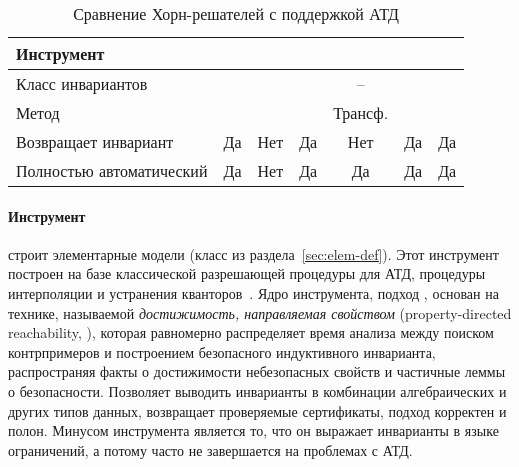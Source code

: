 \begin{table} [htbp]
    \centering
    \begin{threeparttable}%
        \caption{Сравнение Хорн-решателей с поддержкой АТД}\label{tab:hornSolvers}%
        \begin{tabular}{| m{30mm} || c | c | c | c | c | c |}
            \hline
            \hline
            Инструмент & \spacer{} & \racer{} & \eldarica{} & \vericat{} & \hoice{} & \rchc{} \\\hline
            Класс инвариантов & \elemclass{} & \catelemclass{} & \sizeelemclass{} & -- & \elemclass{} & \syncRegFlatClass{}\\\hline
            Метод & \pdr{} & \pdr{} & \cegar{} & Трансф. & \ice{} & \ice{}\\\hline
            Возвращает инвариант & Да & Нет & Да & Нет & Да & Да\\\hline
            Полностью автоматический & Да & Нет & Да & Да & Да & Да\\
            \hline
            \hline
        \end{tabular}
    \end{threeparttable}
\end{table}

\paragraph{Инструмент \spacer{}~\cite{komuravelli2016smt}} строит элементарные модели (класс \elemclass{} из раздела~\cref{sec:elem-def}).
Этот инструмент построен на базе классической разрешающей процедуры для АТД, процедуры интерполяции и устранения кванторов~\cite{bjorner2015playing}.
Ядро инструмента, подход \spacer{}, основан на технике, называемой \emph{достижимость, направляемая свойством} \foreignlanguage{english}{(property-directed reachability, \pdr{})}, которая равномерно распределяет время анализа между поиском контрпримеров и построением безопасного индуктивного инварианта, распространяя факты о достижимости небезопасных свойств и частичные леммы о безопасности.
Позволяет выводить инварианты в комбинации алгебраических и других типов данных, возвращает проверяемые сертификаты, подход корректен и полон.
Минусом инструмента является то, что он выражает инварианты в языке ограничений, а потому часто не завершается на проблемах с АТД.

